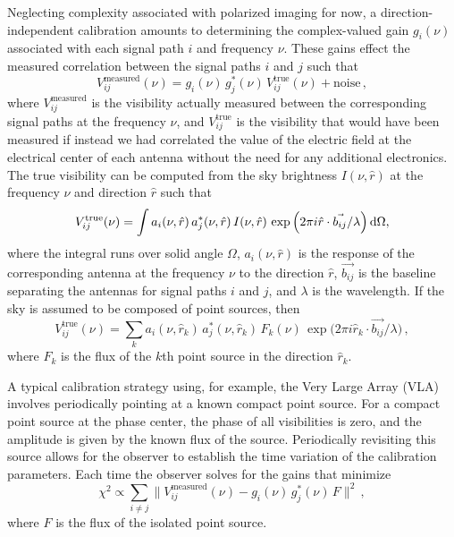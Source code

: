 \begin{bibunit}
Neglecting complexity associated with polarized imaging for now, a direction-independent calibration
amounts to determining the complex-valued gain $g_i(\nu)$ associated with each signal path $i$ and
frequency $\nu$. These gains effect the measured correlation between the signal paths $i$ and $j$
such that
\begin{equation}
    V_{ij}^\text{measured}(\nu) = g_i(\nu)\,g_j^*(\nu)\,V_{ij}^\text{true}(\nu)
        + \text{noise}\,,
\end{equation}
where $V_{ij}^\text{measured}$ is the visibility actually measured between the corresponding signal
paths at the frequency $\nu$, and $V_{ij}^\text{true}$ is the visibility that would have been
measured if instead we had correlated the value of the electric field at the electrical center of
each antenna without the need for any additional electronics. The true visibility
can be computed from the sky brightness $I(\nu, \hat{r})$ at the
frequency $\nu$ and direction $\hat r$ such that
\begin{equation}
    V_{ij}^\text{true}(\nu) = \int a_i(\nu, \hat{r})\,a_j^*(\nu, \hat{r})\,I(\nu, \hat{r})\,
        \exp\Big(2\pi i\hat{r}\cdot\vec{b_{ij}}/\lambda\Big)\,{\textrm d}\Omega,
\end{equation}
where the integral runs over solid angle $\Omega$, $a_i(\nu, \hat{r})$ is the response of the
corresponding antenna at the frequency $\nu$ to the direction $\hat{r}$, $\vec{b_{ij}}$ is the
baseline separating the antennas for signal paths $i$ and $j$, and $\lambda$ is the wavelength.  If
the sky is assumed to be composed of point sources, then
\begin{equation}
    V_{ij}^\text{true}(\nu) = \sum_k a_i(\nu, \hat{r}_k)\,a_j^*(\nu, \hat{r}_k)\,F_k(\nu)\,
        \exp\Big(2\pi i\hat{r}_k\cdot\vec{b_{ij}}/\lambda\Big)\,,
\end{equation}
where $F_k$ is the flux of the $k$th point source in the direction $\hat{r}_k$.

A typical calibration strategy using, for example, the Very Large Array (VLA) involves periodically
pointing at a known compact point source. For a compact point source at the phase center, the phase
of all visibilities is zero, and the amplitude is given by the known flux of the source.
Periodically revisiting this source allows for the observer to establish the time variation of the
calibration parameters. Each time the observer solves for the gains that minimize
\begin{equation}
    \chi^2 \propto \sum_{i \neq j}
        \Big\|V_{ij}^\text{measured}(\nu) - g_i(\nu)\,g_j^*(\nu)\,F\Big\|^2\,,
\end{equation}
where $F$ is the flux of the isolated point source.


\end{bibunit}
